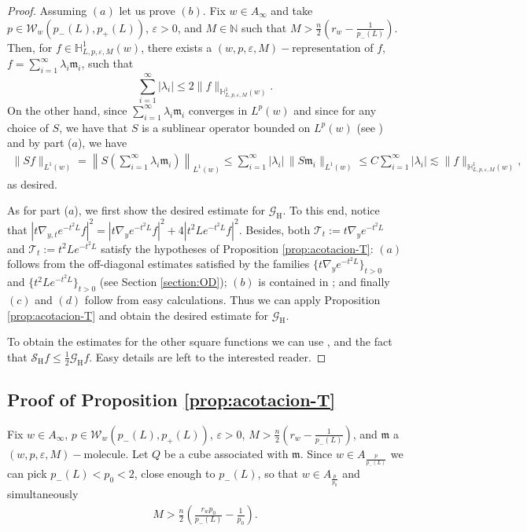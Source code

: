 \documentclass[11pt, a4paper,leqno]{amsart}
\newcommand{\mm}{\mathfrak{m}}
\theoremstyle{plain}
\theoremstyle{definition}
\theoremstyle{remark}
\numberwithin{equation}{section}
\def \N{ \mathbb{N} }
\def \Scal{ \mathcal{S} }
\def \hh{ \mathrm{H} }
\def \Gcal { \mathcal{G} }
\def \mol{ (w,p,\varepsilon,M)-\textrm{molecule}}
\def \p{ (w,p,\varepsilon,M)-\textrm{representation}}
\begin{document}
\begin{proof}
Assuming $(a)$ let us prove $(b)$. Fix $w\in A_{\infty}$ and take $p\in \mathcal{W}_w(p_-(L),p_+(L))$, $\varepsilon>0$, and $M\in \N$ such that $M>\frac{n}{2}\left(r_w-\frac{1}{p_-(L)}\right)$. Then,
for $f\in \mathbb{H}_{L,p,\varepsilon,M}^1(w)$,
 there exists a $\p$ of $f$, $f=\sum_{i=1}^{\infty}{\lambda}_i {\mm}_i$, such that
 $$
 \sum_{i=1}^{\infty}|{\lambda}_i| \leq 2\|f\|_{\mathbb{H}_{L,p,\varepsilon,M}^1(w)}.
 $$
On the other hand, since $\sum_{i=1}^{\infty}{\lambda}_i {\mm}_i$ converges in $L^p(w)$ and since for any choice of $S$, we have that $S$ is a sublinear operator bounded on $L^p(w)$ (see \cite[Theorems 1.12 and 1.13]{MartellPrisuelos}) and by part ($a$), we have
\begin{align*}
\|Sf\|_{L^1(w)}=\left\|S\left(\sum_{i=1}^{\infty}{\lambda}_i {\mm}_i\right)\right\|_{L^1(w)}
\leq \sum_{i=1}^{\infty}|{\lambda}_i|\, \|S {\mm}_i\|_{L^1(w)}\leq C \sum_{i=1}^{\infty}|{\lambda}_i|
\lesssim  \|f\|_{\mathbb{H}_{L,p,\varepsilon,M}^1(w)},
\end{align*}
as desired.

As for part ($a$), we
first show the desired estimate for $\Gcal_{\hh}$. To this end, notice that
$
|t\nabla_{y,t}e^{-t^2L}f|^2= |t\nabla_{y}e^{-t^2L}f|^2+4|t^2Le^{-t^2L}f|^2.
$
Besides, both
$
\mathcal{T}_t:=t\nabla_{y}e^{-t^2L}$
and 
$
\mathcal{T}_t:=t^2Le^{-t^2L}
$
satisfy the hypotheses of Proposition \ref{prop:acotacion-T}:
 $(a)$ follows from the off-diagonal estimates satisfied by the families $\{t\nabla_ye^{-t^2L}\}_{t>0}$ and $\{t^2Le^{-t^2L}\}_{t>0}$  (see Section \ref{section:OD}); $(b)$ is contained in \cite[Theorem 1.12, part $(a)$]{MartellPrisuelos}; and finally $(c)$ and $(d)$ follow from easy calculations. Thus we can apply  Proposition \ref{prop:acotacion-T} and obtain the desired estimate for $\Gcal_{\hh}$.


To obtain the estimates for the other square functions we can use \cite[Theorems 1.14 and 1.15, Remark 4.22]{MartellPrisuelos}, and the fact that $\Scal_{\hh}f\leq \frac{1}{2}\Gcal_{\hh}f$. Easy details are left to the interested reader.
\end{proof}



\subsection{Proof of Proposition \ref{prop:acotacion-T}}
Fix $w\in A_{\infty}$, $p\in \mathcal{W}_w(p_-(L),p_+(L))$, $\varepsilon>0$, $M>\frac{n}{2}\left(r_w-\frac{1}{p_-(L)}\right)$, 
and $\mm$ a $\mol$.
Let $Q$ be a cube associated with $\mm$. Since $w\in A_{\frac{p}{p_-(L)}}$ we can pick $p_-(L)<p_0<2$, close enough to $p_-(L)$, so that $w\in A_{\frac{p}{p_0}}$ and simultaneously
\begin{align}\label{choice-M}
M>\frac{n}{2}\left(\frac{r_wp_0}{p_-(L)}-\frac{1}{p_0}\right).
\end{align}
\end{document}
